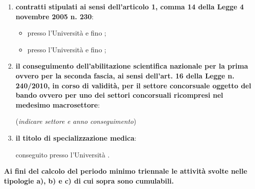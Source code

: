 \begin{enumerate}
\begin{itemize}
\begin{itemize}
\end{itemize}
\end{itemize}
\item \textbf{contratti stipulati ai sensi dell’articolo 1, comma 14 della 
Legge 4 novembre 2005 n. 230}:
\begin{itemize}
 \item presso l’Università   e fino 
 ;
 \item presso l’Università   e fino 
 ;
\end{itemize}
\item \textbf{il conseguimento dell’abilitazione scientifica nazionale per la 
prima ovvero per la seconda fascia, ai sensi dell’art. 16 della Legge n. 
240/2010, in corso di validità, per il settore concorsuale oggetto del bando 
ovvero per uno dei settori concorsuali ricompresi nel medesimo macrosettore}:

(\emph{indicare settore e anno conseguimento}) \myTextField[4cm]{}
\item \textbf{il titolo di specializzazione medica}: 

conseguito  presso l’Università .
\end{enumerate}
\textbf{Ai fini del calcolo del periodo minimo triennale le attività svolte 
nelle tipologie a), b) e c) di cui sopra sono cumulabili.}